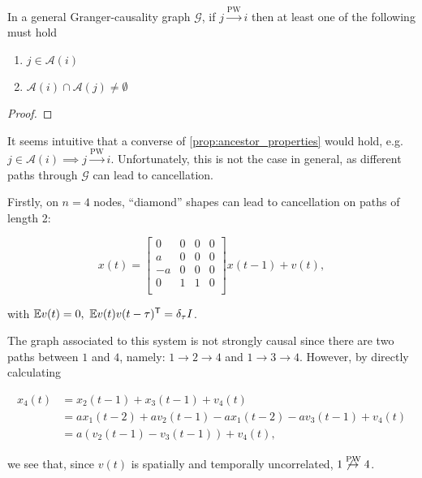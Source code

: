 \documentclass[12pt]{article}
\def\pwgc{\overset{\text{PW}}{\rightarrow}}  %
\def\gcg{\mathcal{G}}  %
\newcommand{\anc}[1]{\mathcal{A}(#1)}  %
\begin{document}
\begin{proposition}
  \label{prop:ancestor_properties}
  In a general Granger-causality graph $\gcg$, if $j \pwgc i$ then at
  least one of the following must hold

  \begin{enumerate}
    \item{$j \in \anc{i}$}
    \item{$\anc{i} \cap \anc{j} \ne \emptyset$}
  \end{enumerate}
\end{proposition}
\begin{proof}
\end{proof}

It seems intuitive that a converse of \ref{prop:ancestor_properties}
would hold, e.g. $j \in \anc{i} \implies j \pwgc i$.  Unfortunately,
this is not the case in general, as different paths through $\gcg$ can
lead to cancellation.

\begin{example}
  Firstly, on $n = 4$ nodes, ``diamond'' shapes can lead to cancellation on paths of length 2:

\begin{equation*}
  x(t) =
  \left[
    \begin{array}{cccc}
      0 & 0 & 0 & 0\\
      a & 0 & 0 & 0\\
      -a & 0 & 0 & 0\\
      0 & 1 & 1 & 0\\
    \end{array}
  \right] x(t - 1) + v(t),
\end{equation*}

with $\mathbb{E} v(t) = 0,\ \mathbb{E} v(t)v(t - \tau)^{\mathsf{T}} = \delta_\tau I$.

The graph associated to this system is not strongly causal since there are two paths between $1$ and $4$, namely: $1 \rightarrow 2 \rightarrow 4$ and $1 \rightarrow 3 \rightarrow 4$.  However, by directly calculating

\begin{align*}
  x_4(t) &= x_2(t - 1) + x_3(t - 1) + v_4(t)\\
         &= ax_1(t - 2) + av_2(t - 1) - ax_1(t - 2) -av_3(t - 1) + v_4(t)\\
         &= a(v_2(t - 1) - v_3(t - 1)) + v_4(t),
\end{align*}

we see that, since $v(t)$ is spatially and temporally uncorrelated, $1 \not\pwgc 4$.
\end{example}
\end{document}
